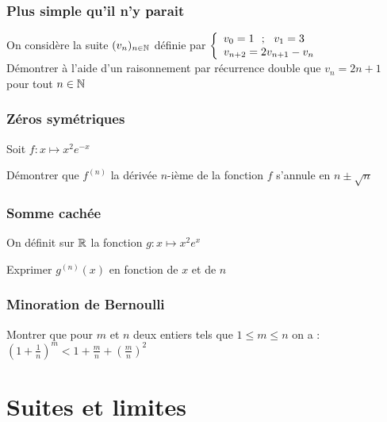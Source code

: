 \documentclass[oneside,12pt]{book}          %
\begin{document}
\subsection{Plus simple qu'il n'y parait}

On considère la suite $(v_n)_{{n\in\mathbb N}}$ définie par $\accolsized{v_0=1~~;~~v_1=3\\v_{n+2}=2v_{n+1}-v_n}{1}$\\[5pt]
Démontrer à l'aide d'un raisonnement par récurrence double que $v_n=2n+1$ pour tout ${n\in\mathbb N}$



\subsection{Zéros symétriques}
Soit $f:x\mapsto x^2e^{-x}$

Démontrer que $f^{(n)}$ la dérivée $n$-ième de la fonction $f$ s'annule en $n\pm\sqrt{n}$



\subsection{Somme cachée}
On définit sur ${\mathbb R}$ la fonction $g:x\mapsto x^2e^x$

Exprimer $g^{(n)}(x)$ en fonction de $x$ et de $n$



\subsection{Minoration de Bernoulli}
Montrer que pour $m$ et $n$ deux entiers tels que $1\leq m\leq n$ on a : $\left(1+\frac{1}{n}\right)^m<1+\frac{m}{n}+\left(\frac{m}{n}\right)^2$




\chapter{Suites et limites}
\newpage
\end{document}
